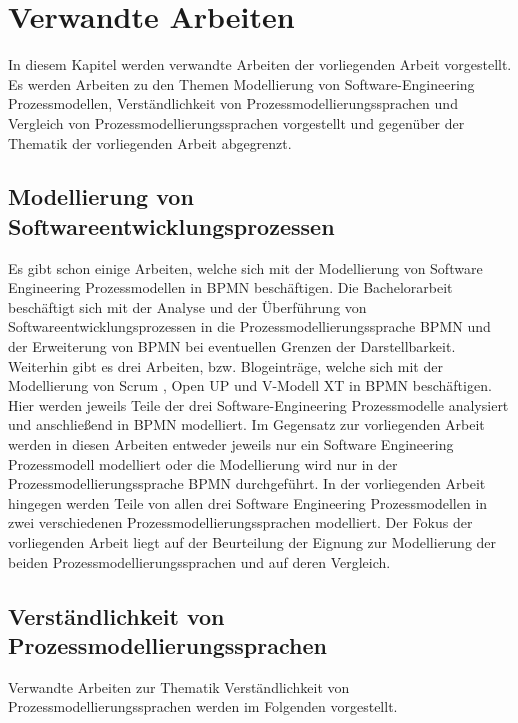 \chapter{Verwandte Arbeiten}\label{sec:chapter9}

In diesem Kapitel werden verwandte Arbeiten der vorliegenden Arbeit vorgestellt. Es werden Arbeiten zu den Themen Modellierung von Software-Engineering Prozessmodellen, Verständlichkeit von Prozessmodellierungssprachen und Vergleich von Prozessmodellierungssprachen vorgestellt und gegenüber der Thematik der vorliegenden Arbeit abgegrenzt.

\section{Modellierung von Softwareentwicklungsprozessen}

Es gibt schon einige Arbeiten, welche sich mit der Modellierung von Software Engineering Prozessmodellen in BPMN beschäftigen.
Die Bachelorarbeit \cite{Menhorn2014} beschäftigt sich mit der Analyse und der Überführung von Softwareentwicklungsprozessen in die Prozessmodellierungssprache BPMN und der Erweiterung von BPMN bei eventuellen Grenzen der Darstellbarkeit.\newline
Weiterhin gibt es drei Arbeiten, bzw. Blogeinträge, welche sich mit der Modellierung von Scrum \cite{software}, Open UP \cite{brunner2007fallstudie} und \cite{Bregenzer2014} V-Modell XT in BPMN beschäftigen. Hier werden jeweils Teile der drei Software-Engineering Prozessmodelle analysiert und anschließend in BPMN modelliert.\newline
Im Gegensatz zur vorliegenden Arbeit werden in diesen Arbeiten entweder jeweils nur ein Software Engineering Prozessmodell modelliert oder die Modellierung wird nur in der Prozessmodellierungssprache BPMN durchgeführt. In der vorliegenden Arbeit hingegen werden Teile von allen drei Software Engineering Prozessmodellen in zwei verschiedenen Prozessmodellierungssprachen modelliert. Der Fokus der vorliegenden Arbeit liegt auf der Beurteilung der Eignung zur Modellierung der beiden Prozessmodellierungssprachen und auf deren Vergleich.\newline


\section{Verständlichkeit von Prozessmodellierungssprachen}

Verwandte Arbeiten zur Thematik Verständlichkeit von Prozessmodellierungssprachen werden im Folgenden vorgestellt.

